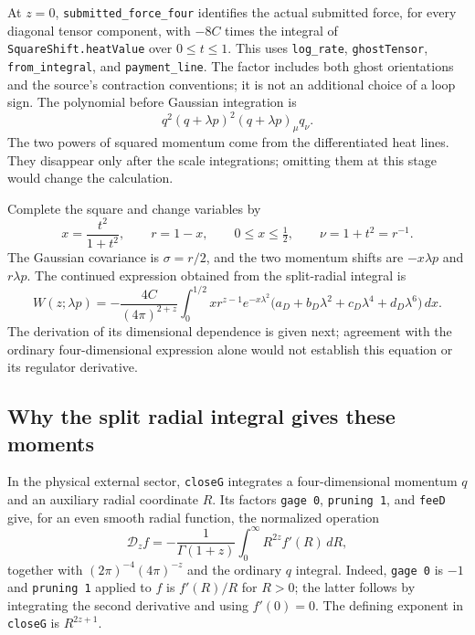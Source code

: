 \documentclass[11pt]{article}
\newcommand{\code}[1]{{\small\nolinkurl{#1}}}
\begin{document}
At $z=0$, \code{submitted_force_four} identifies the actual submitted
force, for every diagonal tensor component, with $-8C$ times the
integral of \code{SquareShift.heatValue} over $0\le t\le1$.
This uses \code{log_rate}, \code{ghostTensor}, \code{from_integral},
and \code{payment_line}. The factor includes both ghost orientations
and the source's contraction conventions; it is not an additional
choice of a loop sign. The polynomial before Gaussian integration is
\[
 q^2(q+\lambda p)^2(q+\lambda p)_\mu q_\nu.
\]
The two powers of squared momentum come from the differentiated heat
lines. They disappear only after the scale integrations; omitting them
at this stage would change the calculation.

Complete the square and change variables by
\[
 x=\frac{t^2}{1+t^2},\qquad r=1-x,\qquad
 0\le x\le\tfrac12,\qquad \nu=1+t^2=r^{-1}.
\]
The Gaussian covariance is $\sigma=r/2$, and the two momentum shifts
are $-x\lambda p$ and $r\lambda p$. The continued expression obtained
from the split-radial integral is
\begin{equation}\label{eq:continued-force-explicit}
 W(z;\lambda p)=-\frac{4C}{(4\pi)^{2+z}}
  \int_0^{1/2}x r^{z-1}e^{-x\lambda^2}
   \bigl(a_D+b_D\lambda^2+c_D\lambda^4+d_D\lambda^6\bigr)\,dx.
\end{equation}
The derivation of its dimensional dependence is given next; agreement
with the ordinary four-dimensional expression alone would not establish
this equation or its regulator derivative.

\subsection{Why the split radial integral gives these moments}

In the physical external sector, \code{closeG} integrates a
four-dimensional momentum $q$ and an auxiliary radial coordinate $R$.
Its factors \code{gage 0}, \code{pruning 1}, and \code{feeD} give,
for an even smooth radial function, the normalized operation
\begin{equation}\label{eq:radial-functional}
 \mathcal D_z f=-\frac1{\Gamma(1+z)}
          \int_0^\infty R^{2z} f'(R)\,dR,
\end{equation}
together with $(2\pi)^{-4}(4\pi)^{-z}$ and the ordinary $q$ integral.
Indeed, \code{gage 0} is $-1$ and
\code{pruning 1} applied to $f$ is $f'(R)/R$ for $R>0$; the latter follows by
integrating the second derivative and using $f'(0)=0$.
The defining exponent in \code{closeG} is $R^{2z+1}$.
\end{document}
